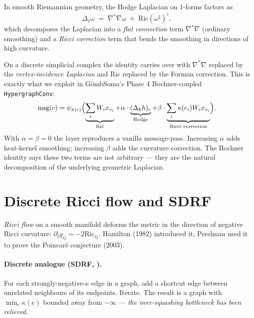 \documentclass[11pt,a4paper]{article}
\begin{document}
In smooth Riemannian geometry, the Hodge Laplacian on $1$-forms
factors as
\[
\Delta_1 \omega \;=\; \nabla^* \nabla \omega \;+\; \mathrm{Ric}(\omega^\sharp)^\flat,
\]
which decomposes the Laplacian into a \emph{flat connection} term
$\nabla^* \nabla$ (ordinary smoothing) and a \emph{Ricci correction}
term that bends the smoothing in directions of high curvature.

On a discrete simplicial complex the identity carries over with
$\nabla^* \nabla$ replaced by the \emph{vertex-incidence Laplacian}
and $\mathrm{Ric}$ replaced by the Forman correction. This is
exactly what we exploit in G\"ombSoma's Phase 4 Bochner-coupled
\texttt{HypergraphConv}:
\[
\text{msg}(c) = \psi_{\pi(c)} \Bigl(
   \underbrace{\sum_i W_i x_{v_i}}_{\text{flat}}
   + \alpha \cdot \underbrace{(\Delta_k h)_c}_{\text{Hodge}}
   + \beta \cdot \underbrace{\sum_i \kappa(e_i) W_i x_{v_i}}_{\text{Ricci correction}}
\Bigr).
\]
With $\alpha = \beta = 0$ the layer reproduces a vanilla
message-pass. Increasing $\alpha$ adds heat-kernel smoothing; increasing
$\beta$ adds the curvature correction. The Bochner identity says
these two terms are not arbitrary --- they are the natural
decomposition of the underlying geometric Laplacian.

\section{Discrete Ricci flow and SDRF}\label{sec:sdrf}

\emph{Ricci flow} on a smooth manifold deforms the metric in the
direction of negative Ricci curvature:
$\partial_t g_{ij} = -2 \mathrm{Ric}_{ij}$. Hamilton (1982) introduced it;
Perelman used it to prove the Poincaré conjecture (2003).

\paragraph{Discrete analogue (SDRF, \cite{Topping2022}).} For each
strongly-negative-$\kappa$ edge in a graph, add a shortcut edge
between unrelated neighbours of its endpoints. Iterate. The result
is a graph with $\min_e \kappa(e)$ bounded away from $-\infty$ ---
\emph{the over-squashing bottleneck has been relieved}.
\end{document}
